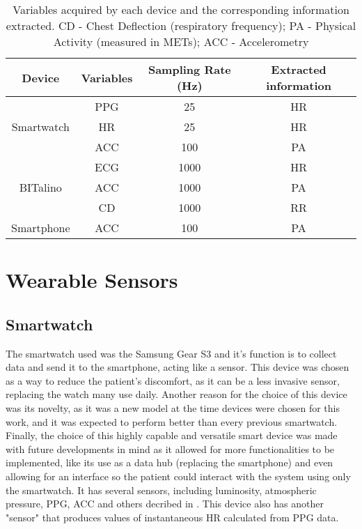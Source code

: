\begin{table}[!h]
	\centering
	\caption{Variables acquired by each device and the corresponding information extracted. 
		CD - Chest Deflection (respiratory frequency); PA - Physical Activity (measured in METs); ACC - Accelerometry}
	\label{table:vars}
	\begin{tabular}{|c|c|c|c|}
		\hline
		\textbf{Device } & \textbf{Variables} & \textbf{Sampling Rate (Hz)} & \textbf{Extracted information} \\ \hline
		\multirow{3}{*}{Smartwatch} & PPG       & 25                 & HR                    \\ \cline{2-4} 
		& HR        & 25                 & HR                    \\ \cline{2-4} 
		& ACC       & 100                & PA                    \\ \hline
		\multirow{3}{*}{BITalino}   & ECG       & 1000               & HR                    \\ \cline{2-4} 
		& ACC       & 1000               & PA                    \\ \cline{2-4} 
		& CD        & 1000               & RR                    \\ \hline
		Smartphone                  & ACC       & 100                & PA                    \\ \hline
	\end{tabular}
\end{table}

\FloatBarrier

\section{Wearable Sensors}

\subsection{Smartwatch}

The smartwatch used was the Samsung Gear S3 and it's function is to collect data and send it to the smartphone, acting like a sensor. This device was chosen as a way to reduce the patient's discomfort, as it can be a less invasive sensor, replacing the watch  many use daily. Another reason for the choice of this device was its novelty, as it was a new model at the time devices were chosen for this work, and it was expected to perform better than every previous smartwatch. Finally, the choice of this highly capable and versatile smart device was made with future developments in mind as it allowed for more functionalities to be implemented, like its use as a data hub (replacing the smartphone) and even allowing for an interface so the patient could interact with the system using only the smartwatch.
It has several sensors, including luminosity, atmospheric pressure, PPG, ACC and others decribed in \cite{Tizen_sensor}. %
This device also has another "sensor" that produces values of instantaneous HR calculated from PPG data.

